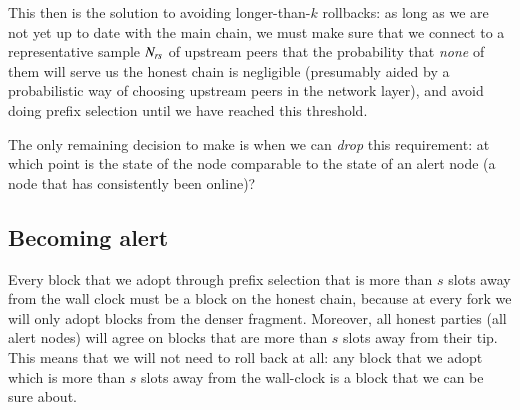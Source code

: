 This then is the solution to avoiding longer-than-$k$ rollbacks: as long as we
are not yet up to date with the main chain, we must make sure that we connect to
a representative sample $N_\mathit{rs}$ of upstream peers that the probability
that \emph{none} of them will serve us the honest chain is negligible
(presumably aided by a probabilistic way of choosing upstream peers in the
network layer), and avoid doing prefix selection until we have reached
this threshold.

The only remaining decision to make is when we can \emph{drop} this requirement:
at which point is the state of the node comparable to the state of an alert node
(a node that has consistently been online)?

\subsection{Becoming alert}
\label{genesis:becoming-alert}

Every block that we adopt through prefix selection that is more than $s$ slots
away from the wall clock must be a block on the honest chain, because at every
fork we will only adopt blocks from the denser fragment. Moreover, all honest
parties (all alert nodes) will agree on blocks that are more than $s$ slots away
from their tip. This means that we will not need to roll back at all: any block
that we adopt which is more than $s$ slots away from the wall-clock is a block
that we can be sure about.

\pagebreak

